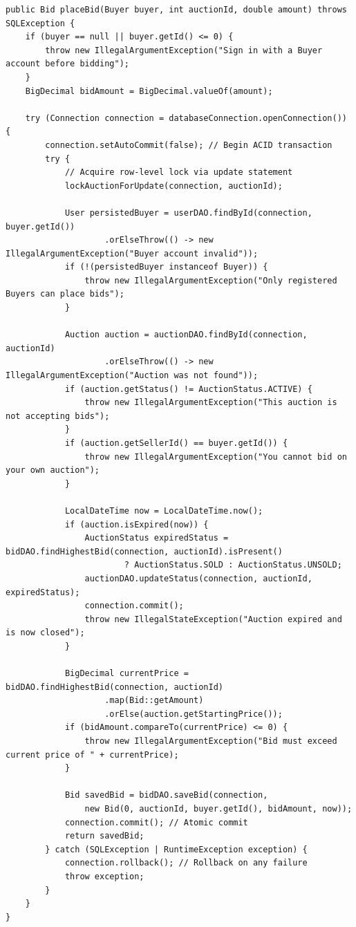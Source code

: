 \begin{lstlisting}[caption={ACID Transaction and Row-Level Locking in \texttt{BidService.java}}, label={lst:bidding_transaction}]
public Bid placeBid(Buyer buyer, int auctionId, double amount) throws SQLException {
    if (buyer == null || buyer.getId() <= 0) {
        throw new IllegalArgumentException("Sign in with a Buyer account before bidding");
    }
    BigDecimal bidAmount = BigDecimal.valueOf(amount);

    try (Connection connection = databaseConnection.openConnection()) {
        connection.setAutoCommit(false); // Begin ACID transaction
        try {
            // Acquire row-level lock via update statement
            lockAuctionForUpdate(connection, auctionId);

            User persistedBuyer = userDAO.findById(connection, buyer.getId())
                    .orElseThrow(() -> new IllegalArgumentException("Buyer account invalid"));
            if (!(persistedBuyer instanceof Buyer)) {
                throw new IllegalArgumentException("Only registered Buyers can place bids");
            }

            Auction auction = auctionDAO.findById(connection, auctionId)
                    .orElseThrow(() -> new IllegalArgumentException("Auction was not found"));
            if (auction.getStatus() != AuctionStatus.ACTIVE) {
                throw new IllegalArgumentException("This auction is not accepting bids");
            }
            if (auction.getSellerId() == buyer.getId()) {
                throw new IllegalArgumentException("You cannot bid on your own auction");
            }

            LocalDateTime now = LocalDateTime.now();
            if (auction.isExpired(now)) {
                AuctionStatus expiredStatus = bidDAO.findHighestBid(connection, auctionId).isPresent()
                        ? AuctionStatus.SOLD : AuctionStatus.UNSOLD;
                auctionDAO.updateStatus(connection, auctionId, expiredStatus);
                connection.commit();
                throw new IllegalStateException("Auction expired and is now closed");
            }

            BigDecimal currentPrice = bidDAO.findHighestBid(connection, auctionId)
                    .map(Bid::getAmount)
                    .orElse(auction.getStartingPrice());
            if (bidAmount.compareTo(currentPrice) <= 0) {
                throw new IllegalArgumentException("Bid must exceed current price of " + currentPrice);
            }

            Bid savedBid = bidDAO.saveBid(connection, 
                new Bid(0, auctionId, buyer.getId(), bidAmount, now));
            connection.commit(); // Atomic commit
            return savedBid;
        } catch (SQLException | RuntimeException exception) {
            connection.rollback(); // Rollback on any failure
            throw exception;
        }
    }
}
\end{lstlisting}

